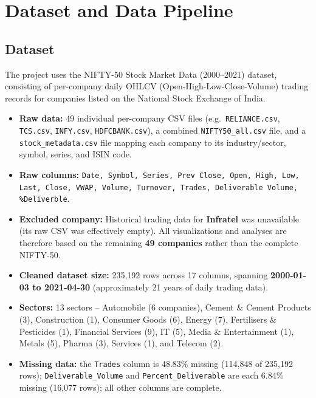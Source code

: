 \documentclass[14pt,a4paper]{extreport}
\begin{document}
\chapter{Dataset and Data Pipeline}

\section{Dataset}

The project uses the NIFTY-50 Stock Market Data (2000--2021) dataset,
consisting of per-company daily OHLCV (Open-High-Low-Close-Volume) trading
records for companies listed on the National Stock Exchange of India.

\begin{itemize}
    \item \textbf{Raw data:} 49 individual per-company CSV files (e.g.\
        \texttt{RELIANCE.csv}, \texttt{TCS.csv}, \texttt{INFY.csv},
        \texttt{HDFCBANK.csv}), a combined \texttt{NIFTY50\_all.csv} file,
        and a \texttt{stock\_metadata.csv} file mapping each company to its
        industry/sector, symbol, series, and ISIN code.
    \item \textbf{Raw columns:} \texttt{Date, Symbol, Series, Prev Close,
        Open, High, Low, Last, Close, VWAP, Volume, Turnover, Trades,
        Deliverable Volume, \%Deliverble}.
    \item \textbf{Excluded company:} Historical trading data for
        \textbf{Infratel} was unavailable (its raw CSV was effectively
        empty). All visualizations and analyses are therefore based on the
        remaining \textbf{49 companies} rather than the complete NIFTY-50.
    \item \textbf{Cleaned dataset size:} 235{,}192 rows across 17 columns,
        spanning \textbf{2000-01-03 to 2021-04-30} (approximately 21 years
        of daily trading data).
    \item \textbf{Sectors:} 13 sectors -- Automobile (6 companies), Cement
        \& Cement Products (3), Construction (1), Consumer Goods (6),
        Energy (7), Fertilisers \& Pesticides (1), Financial Services (9),
        IT (5), Media \& Entertainment (1), Metals (5), Pharma (3), Services
        (1), and Telecom (2).
    \item \textbf{Missing data:} the \texttt{Trades} column is 48.83\%
        missing (114{,}848 of 235{,}192 rows); \texttt{Deliverable\_Volume}
        and \texttt{Percent\_Deliverable} are each 6.84\% missing
        (16{,}077 rows); all other columns are complete.
\end{itemize}
\end{document}
